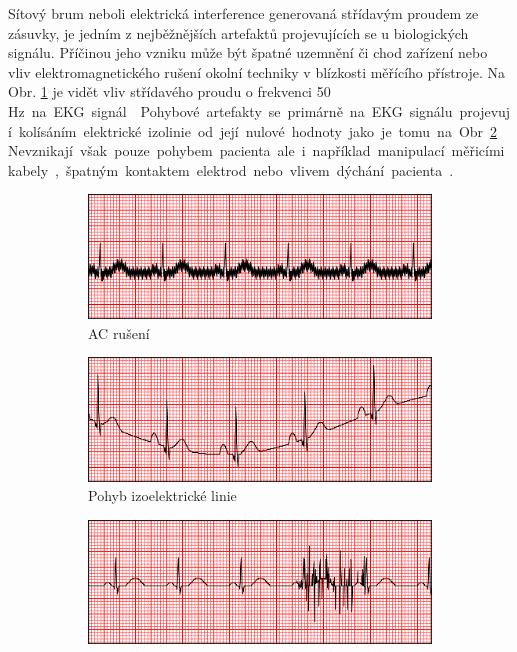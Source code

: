 Sítový brum neboli elektrická interference generovaná střídavým proudem ze
zásuvky, je jedním z nejběžnějších artefaktů projevujících se u biologických
signálu. Příčinou jeho vzniku může být špatné uzemnění či chod zařízení nebo
vliv elektromagnetického rušení okolní techniky v blízkosti měřícího přístroje.
Na Obr. \ref{fig:ac_Interference} je vidět vliv střídavého proudu o
frekvenci 50 \si\Hz~na EKG signál \cite{Goldberger2017}. 

Pohybové artefakty se primárně na EKG signálu projevují kolísáním elektrické
izolinie od její nulové hodnoty jako je tomu na Obr. \ref{fig:w_baseline}.
Nevznikají však pouze pohybem pacienta ale i například manipulací měřicími
kabely, špatným kontaktem elektrod nebo vlivem dýchání pacienta
\cite{Goldberger2017}.

\begin{figure}[h]
	\begin{subfigure}[b]{0.5\linewidth}
		\centering
		\includegraphics[width=0.8\linewidth]{../assets/ecg/ac_Interference}
		\caption{AC rušení}
		\label{fig:ac_Interference}
		\vspace{4ex}
	\end{subfigure}
	\begin{subfigure}[b]{0.5\linewidth}
		\centering
		\includegraphics[width=0.8\linewidth]{../assets/ecg/w_baseline}
		\caption{Pohyb izoelektrické linie}
		\label{fig:w_baseline}
		\vspace{4ex}
	\end{subfigure}
	\begin{subfigure}[b]{0.5\linewidth}
		\centering
		\includegraphics[width=0.8\linewidth]{../assets/ecg/muscle_tremor}

\end{subfigure}
\end{figure}
